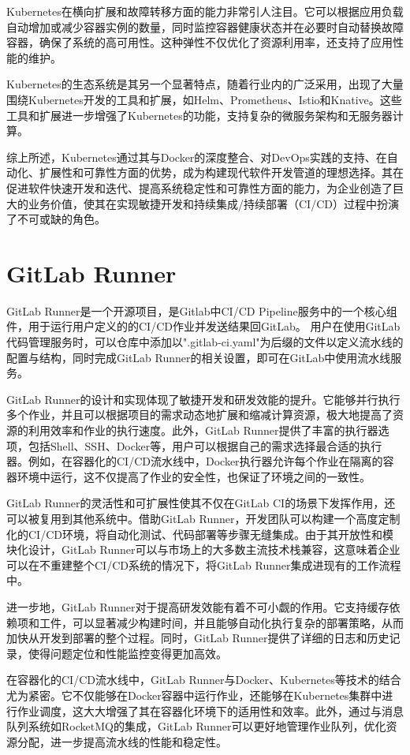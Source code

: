 Kubernetes在横向扩展和故障转移方面的能力非常引人注目。它可以根据应用负载自动增加或减少容器实例的数量，同时监控容器健康状态并在必要时自动替换故障容器，确保了系统的高可用性。这种弹性不仅优化了资源利用率，还支持了应用性能的维护。

Kubernetes的生态系统是其另一个显著特点，随着行业内的广泛采用，出现了大量围绕Kubernetes开发的工具和扩展，如Helm、Prometheus、Istio和Knative。这些工具和扩展进一步增强了Kubernetes的功能，支持复杂的微服务架构和无服务器计算。

综上所述，Kubernetes通过其与Docker的深度整合、对DevOps实践的支持、在自动化、扩展性和可靠性方面的优势，成为构建现代软件开发管道的理想选择。其在促进软件快速开发和迭代、提高系统稳定性和可靠性方面的能力，为企业创造了巨大的业务价值，使其在实现敏捷开发和持续集成/持续部署（CI/CD）过程中扮演了不可或缺的角色。


\section{GitLab Runner}
GitLab Runner是一个开源项目，是Gitlab中CI/CD Pipeline服务中的一个核心组件，用于运行用户定义的的CI/CD作业并发送结果回GitLab。
用户在使用GitLab代码管理服务时，可以仓库中添加以".gitlab-ci.yaml"为后缀的文件以定义流水线的配置与结构，同时完成GitLab Runner的相关设置，即可在GitLab中使用流水线服务。

GitLab Runner的设计和实现体现了敏捷开发和研发效能的提升。它能够并行执行多个作业，并且可以根据项目的需求动态地扩展和缩减计算资源，极大地提高了资源的利用效率和作业的执行速度。此外，GitLab Runner提供了丰富的执行器选项，包括Shell、SSH、Docker等，用户可以根据自己的需求选择最合适的执行器。例如，在容器化的CI/CD流水线中，Docker执行器允许每个作业在隔离的容器环境中运行，这不仅提高了作业的安全性，也保证了环境之间的一致性。

GitLab Runner的灵活性和可扩展性使其不仅在GitLab CI的场景下发挥作用，还可以被复用到其他系统中。借助GitLab Runner，开发团队可以构建一个高度定制化的CI/CD环境，将自动化测试、代码部署等步骤无缝集成。由于其开放性和模块化设计，GitLab Runner可以与市场上的大多数主流技术栈兼容，这意味着企业可以在不重建整个CI/CD系统的情况下，将GitLab Runner集成进现有的工作流程中。

进一步地，GitLab Runner对于提高研发效能有着不可小觑的作用。它支持缓存依赖项和工件，可以显著减少构建时间，并且能够自动化执行复杂的部署策略，从而加快从开发到部署的整个过程。同时，GitLab Runner提供了详细的日志和历史记录，使得问题定位和性能监控变得更加高效。

在容器化的CI/CD流水线中，GitLab Runner与Docker、Kubernetes等技术的结合尤为紧密。它不仅能够在Docker容器中运行作业，还能够在Kubernetes集群中进行作业调度，这大大增强了其在容器化环境下的适用性和效率。此外，通过与消息队列系统如RocketMQ的集成，GitLab Runner可以更好地管理作业队列，优化资源分配，进一步提高流水线的性能和稳定性。


